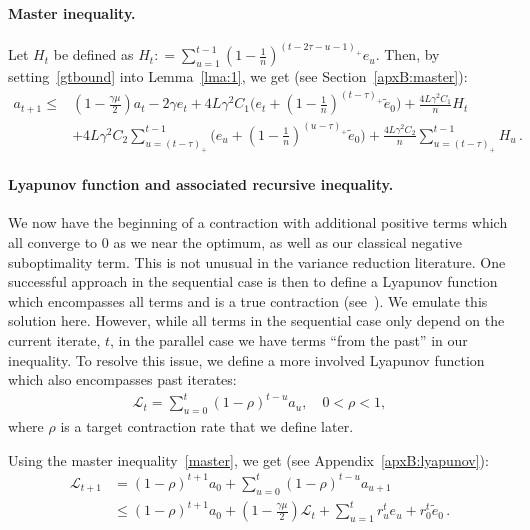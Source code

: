 \documentclass[twoside]{article}
\newcommand{\stepsize}{\gamma}
\newcommand{\strongconvex}{\mu}
\newcommand{\overlap}{\tau}
\newcommand{\contraction}{\rho}
\newcommand{\lipschitz}{L}
\newcommand{\lyapunov}{\mathcal{L}}
\begin{document}
\paragraph{Master inequality.}
Let $H_t$ be defined as ${H_t: = \sum_{u=1}^{t-1} (1 - \frac{1}{n})^{(t-2\overlap-u -1)_+} e_u}$. 
Then, by setting~\eqref{gtbound} into Lemma~\ref{lma:1}, we get (see Section~\ref{apxB:master}):
\begin{equation}\label{master}
\begin{aligned}
a_{t+1} 
\leq &(1 - \frac{\stepsize\strongconvex}{2}) a_t 
	- 2\stepsize e_t 
	+ 4\lipschitz\stepsize^2 C_1 \big(e_t  + (1 - \frac{1}{n})^{(t-\overlap)_+} \tilde e_0 \big)
	+ \frac{4\lipschitz\stepsize^2 C_1}{n} H_t 
\\
	&+4\lipschitz\stepsize^2 C_2\sum_{u=(t-\overlap)_+}^{t-1} (e_u +  (1 - \frac{1}{n})^{(u - \overlap)_+} \tilde e_0 \big)
	+\frac{4\lipschitz\stepsize^2 C_2}{n} \sum_{u=(t-\overlap)_+}^{t-1} H_u  \, .
\end{aligned}
\end{equation}

\paragraph{Lyapunov function and associated recursive inequality.}
We now have the beginning of a contraction with additional positive terms which all converge to $0$ as we near the optimum, as well as our classical negative suboptimality term.
This is not unusual in the variance reduction literature. One successful approach in the sequential case is then to define a Lyapunov function which encompasses all terms and is a true contraction (see~\citet{SAGA, qsaga}).
We emulate this solution here.
However, while all terms in the sequential case only depend on the current iterate, $t$, in the parallel case we have terms ``from the past'' in our inequality.
To resolve this issue, we define a more involved Lyapunov function which also encompasses past iterates: 
\begin{align} \label{eq:LyapunovDefinition}
\lyapunov_t = \sum_{u=0}^t (1-\contraction)^{t-u}a_u, \quad 0<\contraction < 1,
\end{align}
where $\contraction$ is a target contraction rate that we define later.

Using the master inequality~\eqref{master}, we get (see Appendix~\ref{apxB:lyapunov}):
\begin{align}\label{Lyapunov}
\lyapunov_{t+1} 
&= (1 - \contraction)^{t+1}a_0 
	+ \sum_{u=0}^t(1 - \contraction)^{t-u}a_{u+1}
\nonumber \\
&\leq (1 - \contraction)^{t+1}a_0 + (1-\frac{\stepsize\strongconvex}{2})\lyapunov_t + \sum_{u=1}^t r_u^t e_u + r_0^t \tilde e_0  \, .
\end{align}
\end{document}
